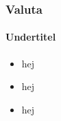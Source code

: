 
\begin{frame}
\frametitle{Valuta}
\framesubtitle{Undertitel} %
    \begin{itemize}
        \item{hej}
        \pause
        \item{hej}
        \pause
        \item{hej}
    \end{itemize}
\end{frame}
    
